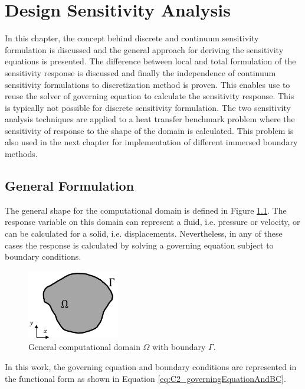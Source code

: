 \chapter{Design Sensitivity Analysis}
In this chapter, the concept behind discrete and continuum sensitivity formulation is discussed and the general approach for deriving the sensitivity equations is presented. The difference between local and total formulation of the sensitivity response is discussed and finally the independence of continuum sensitivity formulations to discretization method is proven. This enables use to reuse the solver of governing equation to calculate the sensitivity response. This is typically not possible for discrete sensitivity formulation. The two sensitivity analysis techniques are applied to a heat transfer benchmark problem where the sensitivity of response to the shape of the domain is calculated. This problem is also used in the next chapter for implementation of different immersed boundary methods.

\section{General Formulation}
The general shape for the computational domain is defined in Figure \ref{fig:C2_continuumDomain}. The response variable on this domain can represent a fluid, i.e. pressure or velocity, or can be calculated for a solid, i.e. displacements. Nevertheless, in any of these cases the response is calculated by solving a governing equation subject to boundary conditions. 

\begin{figure}
	\centering
	\includegraphics[width=4.00cm]{Chapter_2/figure/general_domain.png}
	\caption{General computational domain $\Omega$ with boundary $\Gamma$.}
	\label{fig:C2_continuumDomain}
\end{figure}

In this work, the governing equation and boundary conditions are represented in the functional form as shown in Equation \eqref{eq:C2_governingEquationAndBC}.

